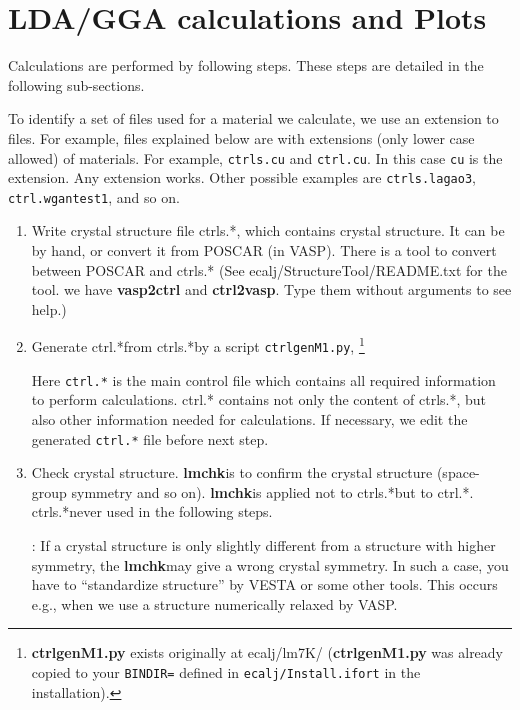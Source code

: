 \documentclass[a4paper,10pt,epsf,fleqn]{article}
\newcommand{\exe}[1]{{\bf #1}}
\newcommand{\io}[1]{{\sf  #1}}
\newcommand{\lmchk}{{\exe{lmchk}\space }}
\newcommand{\ctrl}{{\io{ctrl.*}\space }}
\newcommand{\ctrls}{{\io{ctrls.*}\space }}
\begin{document}
\section{LDA/GGA calculations and Plots}
\label{ldagga}
Calculations are performed by following steps. 
These steps are detailed in the following sub-sections. 

To identify a set of files used for a material we calculate, we use 
an extension to files. For example, files explained below are
with extensions (only lower case allowed) of materials.
For example, \verb+ctrls.cu+ and \verb+ctrl.cu+. In this case
\verb+cu+ is the extension. Any extension works. Other possible examples are
\verb+ctrls.lagao3+, \verb+ctrl.wgantest1+, and so on.

\begin{enumerate}
\item Write crystal structure file \ctrls, which contains crystal structure.
  It can be by hand, or convert it from POSCAR (in VASP). There
  is a tool to convert between POSCAR and \ctrls
  (See \io{ecalj/StructureTool/README.txt} for the tool.
  we have \exe{vasp2ctrl} and \exe{ctrl2vasp}. Type them without
      arguments to see help.)

\item Generate \ctrl from \ctrls by a script \verb+ctrlgenM1.py+,
      \footnote{\exe{ctrlgenM1.py} exists originally at \io{ecalj/lm7K/}
       (\exe{ctrlgenM1.py} was already copied to your 
       {\tt BINDIR=} defined in {\tt ecalj/Install.ifort} in the installation).}
 
     Here \verb+ctrl.*+ is the main control file which contains all required
     information to perform calculations. \io{ctrl.*} contains not only
      the content of \ctrls, but also other information 
     needed for calculations.
     If necessary, we edit the generated \verb+ctrl.*+ file before next step.

\item
     Check crystal structure. \lmchk is to confirm the crystal structure
     (space-group symmetry and so on). \lmchk is applied not to
     \ctrls but to \ctrl. \ctrls never used in the following steps.

     :
      If a crystal structure is only slightly different from a
     structure with higher symmetry, the \lmchk may give a wrong crystal
     symmetry. In such a case, you have to ``standardize structure'' by
     VESTA or some other tools. This occurs e.g., when we use a structure
     numerically relaxed by VASP.


\end{enumerate}
\end{document}
